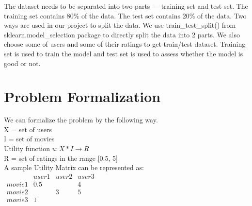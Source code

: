 \documentclass[sigconf]{acmart}
\begin{document}
The dataset needs to be separated into two parts --- training set and test set. The training set contains 80\% of the data. The test set contains 20\% of the data. Two ways are used in our project to split the data. We use train\_test\_split() from sklearn.model\_selection package to directly split the data into 2 parts. We also choose some of users and some of their ratings to get train/test dataset. Training set is used to train the model and test set is used to assess whether the model is good or not.


\section{Problem Formalization}\label{sec:formal}
We can formalize the problem by the following way.\\
X = set of users\\
I = set of movies\\
Utility function $u: X * I \rightarrow R$\\
R = set of ratings in the range [0.5, 5]\\
A sample Utility Matrix can be represented as:\\
$\begin{matrix} 
  & user1 & user2 & user3 \\
movie1 & 0.5 &   & 4\\
movie2 &     & 3 & 5\\
movie3 & 1   &   &  \\
\end{matrix}$\\
\\
\end{document}
